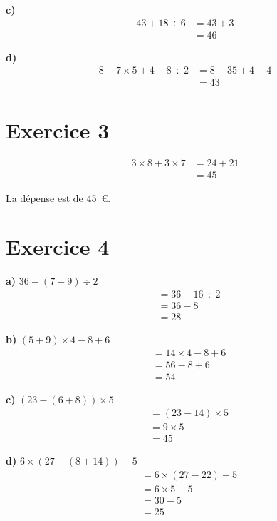 \documentclass[12pt]{extarticle}
\begin{document}
\textbf{c)}
\begin{align*}
43 + 18 \div 6 &= 43 + 3 \\
               &= 46
\end{align*}

\textbf{d)}
\begin{align*}
8 + 7 \times 5 + 4 - 8 \div 2 &= 8 + 35 + 4 - 4 \\
                              &= 43
\end{align*}

\section*{Exercice 3}
\begin{align*}
3 \times 8 + 3 \times 7 &= 24 + 21 \\
                        &= 45
\end{align*}

La dépense est de 45~€.

\section*{Exercice 4}

\textbf{a)} $36 - (7 + 9) \div 2$
\begin{align*}
&= 36 - 16 \div 2 \\
&= 36 - 8 \\
&= 28
\end{align*}

\textbf{b)} $(5 + 9) \times 4 - 8 + 6$
\begin{align*}
&= 14 \times 4 - 8 + 6 \\
&= 56 - 8 + 6 \\
&= 54
\end{align*}

\textbf{c)} $(23 - (6 + 8)) \times 5$
\begin{align*}
&= (23 - 14) \times 5 \\
&= 9 \times 5 \\
&= 45
\end{align*}

\textbf{d)} $6 \times (27 - (8 + 14)) - 5$
\begin{align*}
&= 6 \times (27 - 22) - 5 \\
&= 6 \times 5 - 5 \\
&= 30 - 5 \\
&= 25
\end{align*}
\end{document}
